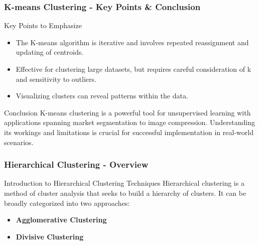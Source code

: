 \documentclass[aspectratio=169]{beamer}
\begin{document}
\begin{frame}[fragile]
    \frametitle{K-means Clustering - Key Points & Conclusion}
    \begin{block}{Key Points to Emphasize}
        \begin{itemize}
            \item The K-means algorithm is iterative and involves repeated reassignment and updating of centroids.
            \item Effective for clustering large datasets, but requires careful consideration of k and sensitivity to outliers.
            \item Visualizing clusters can reveal patterns within the data.
        \end{itemize}
    \end{block}

    \begin{block}{Conclusion}
        K-means clustering is a powerful tool for unsupervised learning with applications spanning market segmentation to image compression. Understanding its workings and limitations is crucial for successful implementation in real-world scenarios.
    \end{block}
\end{frame}

\begin{frame}[fragile]
  \frametitle{Hierarchical Clustering - Overview}
  \begin{block}{Introduction to Hierarchical Clustering Techniques}
    Hierarchical clustering is a method of cluster analysis that seeks to build a hierarchy of clusters. It can be broadly categorized into two approaches:
  \end{block}
  
  \begin{itemize}
    \item \textbf{Agglomerative Clustering}
    \item \textbf{Divisive Clustering}
  \end{itemize}
\end{frame}
\end{document}
